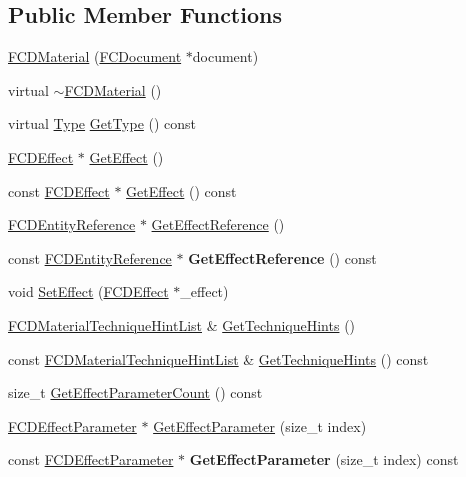 \subsection*{Public Member Functions}
\begin{DoxyCompactItemize}
\item 
\hyperlink{classFCDMaterial_aa4dd4881fb4a591e9362eed48718a8ad}{FCDMaterial} (\hyperlink{classFCDocument}{FCDocument} $\ast$document)
\item 
virtual \hyperlink{classFCDMaterial_a2243f5a10bb1d04138dd5d37ebcf397b}{$\sim$FCDMaterial} ()
\item 
virtual \hyperlink{classFCDEntity_a9301a4bd5f4d4190ec13e40db4effdd7}{Type} \hyperlink{classFCDMaterial_aeeaf2e7f96a1b3efc7daac490b1e5e8f}{GetType} () const 
\item 
\hyperlink{classFCDEffect}{FCDEffect} $\ast$ \hyperlink{classFCDMaterial_a1992dea70f24be2d15505e7713f144aa}{GetEffect} ()
\item 
const \hyperlink{classFCDEffect}{FCDEffect} $\ast$ \hyperlink{classFCDMaterial_ad9b523d46b0c8f180663ba408fe0c4c3}{GetEffect} () const 
\item 
\hyperlink{classFCDEntityReference}{FCDEntityReference} $\ast$ \hyperlink{classFCDMaterial_a91b8928679af106f839d3f9bc2cdf98c}{GetEffectReference} ()
\item 
\hypertarget{classFCDMaterial_a5e8270a47a37ee33d91aefa405f9b1ca}{
const \hyperlink{classFCDEntityReference}{FCDEntityReference} $\ast$ {\bfseries GetEffectReference} () const }
\label{classFCDMaterial_a5e8270a47a37ee33d91aefa405f9b1ca}

\item 
void \hyperlink{classFCDMaterial_af5a95739d8051b054f982f562887dbf4}{SetEffect} (\hyperlink{classFCDEffect}{FCDEffect} $\ast$\_\-effect)
\item 
\hyperlink{classfm_1_1vector}{FCDMaterialTechniqueHintList} \& \hyperlink{classFCDMaterial_a3447a9b64d3e2c9f3d11580481eed937}{GetTechniqueHints} ()
\item 
const \hyperlink{classfm_1_1vector}{FCDMaterialTechniqueHintList} \& \hyperlink{classFCDMaterial_ab8af6e4d2bf012eea502b6a1dfb09a95}{GetTechniqueHints} () const 
\item 
size\_\-t \hyperlink{classFCDMaterial_a141e00a179b153b6cccbf9b274276bb9}{GetEffectParameterCount} () const 
\item 
\hyperlink{classFCDEffectParameter}{FCDEffectParameter} $\ast$ \hyperlink{classFCDMaterial_ae3f2d3c5d8b9c9c9d96254d5fff85010}{GetEffectParameter} (size\_\-t index)
\item 
\hypertarget{classFCDMaterial_abd2b15ea80230dcd28a2507d6ce7604a}{
const \hyperlink{classFCDEffectParameter}{FCDEffectParameter} $\ast$ {\bfseries GetEffectParameter} (size\_\-t index) const }
\label{classFCDMaterial_abd2b15ea80230dcd28a2507d6ce7604a}


\end{DoxyCompactItemize}
